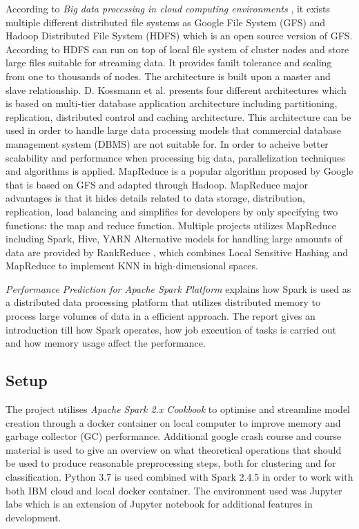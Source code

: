 \documentclass[../main.tex]{subfiles}
\begin{document}
According to \textit{Big data processing in cloud computing environments} \cite{ji2012big}, it exists multiple different distributed file systems as Google File System (GFS) and Hadoop Distributed File System (HDFS) which is an open source version of GFS. According to \cite{hashem2015rise} HDFS can run on top of local file system of cluster nodes and store large files suitable for streaming data. It provides fauilt tolerance and scaling from one to thousands of nodes. The architecture is built upon a master and slave relationship.  D. Kossmann et al.\cite{kossmann2010evaluation} presents four different architectures which is based on multi-tier database application architecture including partitioning, replication, distributed control and caching architecture. This architecture can be used in order to handle large data processing models that commercial database management system (DBMS) are not suitable for.
In order to acheive better scalability and performance when processing big data, parallelization techniques and algorithms is applied. MapReduce is a popular algorithm proposed by Google that is based on GFS and adapted through Hadoop. MapReduce major advantages is that it hides details related to data storage, distribution, replication, load balancing and simplifies for developers by only specifying two functions: the map and reduce function. Multiple projects utilizes MapReduce including Spark\cite{zaharia2010spark}, Hive\cite{thusoo2009hive}, YARN\cite{ekanayake2010twister} Alternative models for handling large amounts of data are provided by RankReduce \cite{stupar2010rankreduce}, which combines Local Sensitive Hashing and MapReduce to implement KNN in high-dimensional spaces.

\textit{Performance Prediction for Apache Spark Platform} \cite{wang2015performance} explains how Spark is used as a distributed data processing platform that utilizes distributed memory to process large volumes of data in a efficient approach. The report gives an introduction till how Spark operates, how job execution of tasks is carried out and how memory usage affect the performance.


\subsection{Setup}

The project utilises \textit{Apache Spark 2.x Cookbook} \cite{yadav2017apache} to optimise and streamline model creation through a docker container on local computer to improve memory and garbage collector (GC) performance. Additional google crash course and course material is used to give an overview on what theoretical operations that should be used to produce reasonable preprocessing steps, both for clustering and for classification. Python 3.7 is used combined with Spark 2.4.5 in order to work with both IBM cloud and local docker container. The environment used was Jupyter labs which is an extension of Jupyter notebook for additional features in development.
\end{document}
